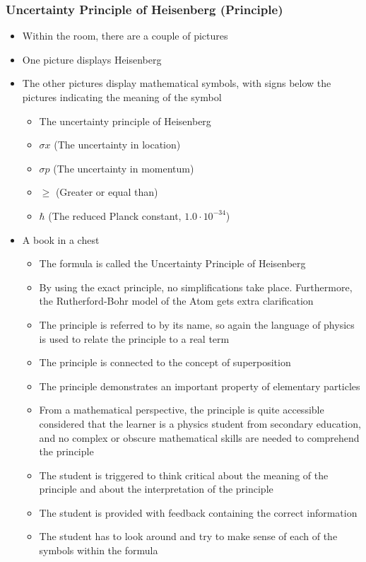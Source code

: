 \documentclass[11pt,twoside]{report} %
\begin{document}
\subsubsection{Uncertainty Principle of Heisenberg (Principle)}
\begin{itemize}
	\item Within the room, there are a couple of pictures
	\item One picture displays Heisenberg
	\item The other pictures display mathematical symbols, with signs below the pictures indicating the meaning of the symbol
	\begin{itemize}
		\item The uncertainty principle of Heisenberg
		\item $\sigma x$ (The uncertainty in location)
		\item $\sigma p$ (The uncertainty in momentum)
		\item $\geq$ (Greater or equal than)
		\item $\hbar$ (The reduced Planck constant, $1.0 \cdot 10^{-34}$)
	\end{itemize}
	\item A book in a chest
	\begin{itemize}
		\item The formula is called the Uncertainty Principle of Heisenberg
		\item By using the exact principle, no simplifications take place. Furthermore, the Rutherford-Bohr model of the Atom gets extra clarification
		\item The principle is referred to by its name, so again the language of physics is used to relate the principle to a real term
		\item The principle is connected to the concept of superposition
		\item The principle demonstrates an important property of elementary particles
		\item From a mathematical perspective, the principle is quite accessible considered that the learner is a physics student from secondary education, and no complex or obscure mathematical skills are needed to comprehend the principle
		\item The student is triggered to think critical about the meaning of the principle and about the interpretation of the principle
		\item The student is provided with feedback containing the correct information
		\item The student has to look around and try to make sense of each of the symbols within the formula

\end{itemize}
\end{itemize}
\end{document}
